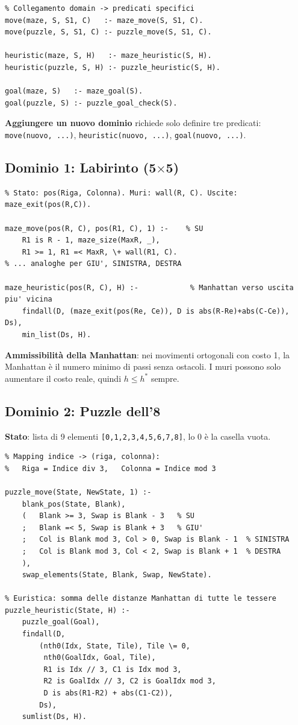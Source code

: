 \documentclass[12pt,a4paper]{article}
\begin{document}
\begin{lstlisting}
% Collegamento domain -> predicati specifici
move(maze, S, S1, C)   :- maze_move(S, S1, C).
move(puzzle, S, S1, C) :- puzzle_move(S, S1, C).

heuristic(maze, S, H)   :- maze_heuristic(S, H).
heuristic(puzzle, S, H) :- puzzle_heuristic(S, H).

goal(maze, S)   :- maze_goal(S).
goal(puzzle, S) :- puzzle_goal_check(S).
\end{lstlisting}

\textbf{Aggiungere un nuovo dominio} richiede solo definire tre predicati:
\texttt{move(nuovo, ...)}, \texttt{heuristic(nuovo, ...)}, \texttt{goal(nuovo, ...)}.

\subsection{Dominio 1: Labirinto (5$\times$5)}

\begin{lstlisting}
% Stato: pos(Riga, Colonna). Muri: wall(R, C). Uscite: maze_exit(pos(R,C)).

maze_move(pos(R, C), pos(R1, C), 1) :-    % SU
    R1 is R - 1, maze_size(MaxR, _),
    R1 >= 1, R1 =< MaxR, \+ wall(R1, C).
% ... analoghe per GIU', SINISTRA, DESTRA

maze_heuristic(pos(R, C), H) :-            % Manhattan verso uscita piu' vicina
    findall(D, (maze_exit(pos(Re, Ce)), D is abs(R-Re)+abs(C-Ce)), Ds),
    min_list(Ds, H).
\end{lstlisting}

\textbf{Ammissibilità della Manhattan}: nei movimenti ortogonali con costo 1,
la Manhattan è il numero minimo di passi senza ostacoli. I muri possono solo
aumentare il costo reale, quindi $h \le h^*$ sempre.

\subsection{Dominio 2: Puzzle dell'8}

\textbf{Stato}: lista di 9 elementi \texttt{[0,1,2,3,4,5,6,7,8]}, lo 0 è la casella vuota.

\begin{lstlisting}
% Mapping indice -> (riga, colonna):
%   Riga = Indice div 3,   Colonna = Indice mod 3

puzzle_move(State, NewState, 1) :-
    blank_pos(State, Blank),
    (   Blank >= 3, Swap is Blank - 3   % SU
    ;   Blank =< 5, Swap is Blank + 3   % GIU'
    ;   Col is Blank mod 3, Col > 0, Swap is Blank - 1  % SINISTRA
    ;   Col is Blank mod 3, Col < 2, Swap is Blank + 1  % DESTRA
    ),
    swap_elements(State, Blank, Swap, NewState).

% Euristica: somma delle distanze Manhattan di tutte le tessere
puzzle_heuristic(State, H) :-
    puzzle_goal(Goal),
    findall(D,
        (nth0(Idx, State, Tile), Tile \= 0,
         nth0(GoalIdx, Goal, Tile),
         R1 is Idx // 3, C1 is Idx mod 3,
         R2 is GoalIdx // 3, C2 is GoalIdx mod 3,
         D is abs(R1-R2) + abs(C1-C2)),
        Ds),
    sumlist(Ds, H).
\end{lstlisting}
\end{document}
